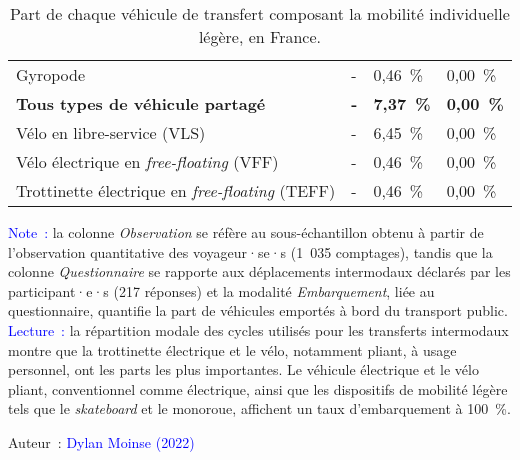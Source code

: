 \begin{table}[h!]
{\begin{tabular}{p{}p{}p{}p{}}
\small{Gyropode} & \small{-} & \small{0,46~\%} & \small{0,00~\%}\\
        \hdashline
\small{\textbf{Tous types de véhicule partagé}} & \small{\textbf{-}} & \small{\textbf{7,37~\%}} & \small{\textbf{0,00~\%}}\\
\small{Vélo en libre-service (\acrshort{VLS})} & \small{-} & \small{6,45~\%} & \small{0,00~\%}\\
\small{Vélo électrique en \textsl{free-floating} (\acrshort{VFF})} & \small{-} & \small{0,46~\%} & \small{0,00~\%}\\
\small{Trottinette électrique en \textsl{free-floating} (\acrshort{TEFF})} & \multirow{1.5}{*}{\small{-}} & \multirow{1.5}{*}{\small{0,46~\%}} & \multirow{1.5}{*}{\small{0,00~\%}}\\
        \hline
        \end{tabular}}
    \caption{Part de chaque véhicule de transfert composant la mobilité individuelle légère, en France.}
    \label{table-chap4:part-modale-vehicules-intermodalite}
        \vspace{5pt}
        \begin{flushleft}\scriptsize{
        \textcolor{blue}{Note~:} la colonne \textsl{Observation} se réfère au sous-échantillon obtenu à partir de l'observation quantitative des voyageur·se·s (1~035 comptages), tandis que la colonne \textsl{Questionnaire} se rapporte aux déplacements intermodaux déclarés par les participant·e·s (217 réponses) et la modalité \textsl{Embarquement}, liée au questionnaire, quantifie la part de véhicules emportés à bord du transport public.
        \\
        \textcolor{blue}{Lecture~:} la répartition modale des cycles utilisés pour les transferts intermodaux montre que la trottinette électrique et le vélo, notamment pliant, à usage personnel, ont les parts les plus importantes. Le véhicule électrique et le vélo pliant, conventionnel comme électrique, ainsi que les dispositifs de mobilité légère tels que le \textsl{skateboard} et le monoroue, affichent un taux d'embarquement à 100~\%.
        }\end{flushleft}
        \begin{flushright}\scriptsize
        Auteur~: \textcolor{blue}{Dylan Moinse (2022)}
        \end{flushright}
        \end{table}